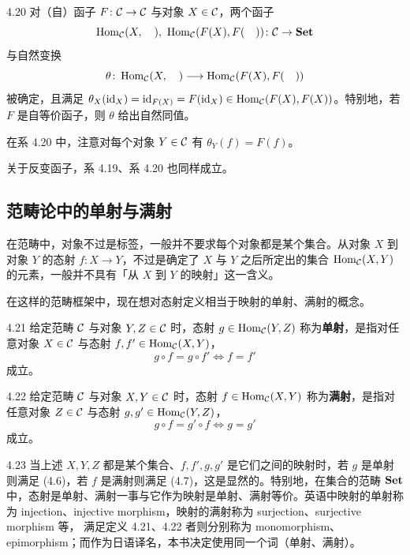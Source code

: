 \begin{corollary}{4.20}
对（自）函子 $F\colon\mathcal{C}\to\mathcal{C}$ 与对象 $X\in\mathcal{C}$，两个函子
\[ \Hom_{\cC}(X,\quad),\ \Hom_{\cC}(F(X),F(\quad))\colon\cC\to\Set \]
与自然变换
\[ \theta\colon\operatorname{Hom}_{\mathcal{C}}(X,\quad)\longrightarrow\operatorname{Hom}_{\mathcal{C}}(F(X),F(\quad)) \]
被确定，且满足 $\theta_X(\mathrm{id}_X)=\mathrm{id}_{F(X)}=F(\mathrm{id}_X)\in\operatorname{Hom}_{\mathcal{C}}(F(X),F(X))$。特别地，若 $F$ 是自等价函子，则 $\theta$ 给出自然同值。
\end{corollary}

在系 4.20 中，注意对每个对象 $Y\in\mathcal{C}$ 有 $\theta_Y(f)=F(f)$。

关于反变函子，系 4.19、系 4.20 也同样成立。

\subsection{范畴论中的单射与满射}

在范畴中，对象不过是标签，一般并不要求每个对象都是某个集合。从对象 $X$ 到对象 $Y$ 的态射 $f\colon X\to Y$，不过是确定了 $X$ 与 $Y$ 之后所定出的集合 $\operatorname{Hom}_{\mathcal{C}}(X,Y)$ 的元素，一般并不具有「从 $X$ 到 $Y$ 的映射」这一含义。

在这样的范畴框架中，现在想对态射定义相当于映射的单射、满射的概念。

\begin{definition}{4.21}
给定范畴 $\mathcal{C}$ 与对象 $Y,Z\in\mathcal{C}$ 时，态射 $g\in\operatorname{Hom}_{\mathcal{C}}(Y,Z)$ 称为\textbf{单射}，是指对任意对象 $X\in\mathcal{C}$ 与态射 $f,f'\in\operatorname{Hom}_{\mathcal{C}}(X,Y)$，
\begin{equation}
  g\circ f=g\circ f'\iff f=f' \tag{4.6}
\end{equation}
成立。
\end{definition}

\begin{definition}{4.22}
给定范畴 $\mathcal{C}$ 与对象 $X,Y\in\mathcal{C}$ 时，态射 $f\in\operatorname{Hom}_{\mathcal{C}}(X,Y)$ 称为\textbf{满射}，是指对任意对象 $Z\in\mathcal{C}$ 与态射 $g,g'\in\operatorname{Hom}_{\mathcal{C}}(Y,Z)$，
\begin{equation}
  g\circ f=g'\circ f\iff g=g' \tag{4.7}
\end{equation}
成立。
\end{definition}

\begin{remark}{4.23}
当上述 $X,Y,Z$ 都是某个集合、$f,f',g,g'$ 是它们之间的映射时，若 $g$ 是单射则满足 (4.6)，若 $f$ 是满射则满足 (4.7)，这是显然的。特别地，在集合的范畴 $\mathbf{Set}$ 中，态射是单射、满射一事与它作为映射是单射、满射等价。英语中映射的单射称为 injection、injective morphism，映射的满射称为 surjection、surjective morphism 等，
满足定义 4.21、4.22 者则分别称为 monomorphism、epimorphism；而作为日语译名，本书决定使用同一个词（单射、满射）。
\end{remark}

